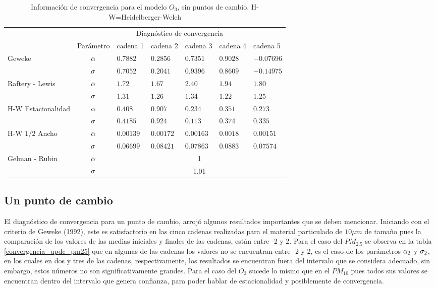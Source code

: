 \begin{table}[!h]
\centering
\begin{tabular}{|l|c|l|l|l|l|l|}
\hline
& \multicolumn{6}{|c|}{Diagnóstico de convergencia} \\
\cline{2-7}
& Parámetro & cadena 1  & cadena 2  & cadena 3 & cadena 4 & cadena 5	 \\
\hline \hline
\multirow{2}{2.5cm}{Geweke} & $\alpha$ & $0.7882$ & $0.2856 $ & $0.7351$ & $0.9028$  & $ -0.07696$\\ \cline{2-7}
& $\sigma$& $0.7052 $ & $0.2041$ & $0.9396$ & $0.8609$ & $-0.14975$\\
  \cline{1-7}
\multirow{2}{2.5cm}{Raftery - Lewis} & $\alpha$ & $ 1.72  $& $  1.67$ & $ 2.40$ & $1.94 $ & $ 1.80 $\\ \cline{2-7}
& $\sigma$ & \multicolumn{1}{l|}{$1.31$} & $1.26$ & $ 1.34 $ & $1.22 $ & $1.25$ \\ \cline{1-7}
\multirow{2}{2.5cm}{H-W Estacionalidad} & $\alpha$ & $0.408$ & $0.907 $ & $0.234$ & $ 0.351$ & $0.273$ \\ \cline{2-7}
&$\sigma$ & \multicolumn{1}{l|}{$0.4185$} & $ 0.924$ &  $ 0.113  $ & $0.374$ & $ 0.335  $ \\ \cline{1-7}
\multirow{2}{2.5cm}{H-W $1/2$ Ancho} & $\alpha$ & $0.00139$ & $0.00172$ & $0.00163$ & $0.0018 $  & $0.00151$  \\ \cline{2-7}
&$\sigma$ & \multicolumn{1}{l|}{$0.06699 $} & $0.08421$ & $0.07863$ & $ 0.0883$ & $0.07574 $ \\ \cline{1-7}

\multirow{2}{2.5cm}{Gelman - Rubin} & $\alpha$ & \multicolumn{5}{|c|}{1}\\ \cline{2-7}
&$\sigma$ &  \multicolumn{5}{|c|}{1.01} \\ \cline{1-7}



\end{tabular}
\caption{Información de convergencia para el modelo $O_3$, sin puntos de cambio. H-W=Heidelberger-Welch}
\label{converozono}
\end{table}

\subsection{Un punto de cambio}

El diagnóstico de convergencia para un punto de cambio, arrojó algunos resultados importantes que se deben mencionar. Iniciando con el criterio de Geweke (1992), este es satisfactorio en las cinco cadenas realizadas para el material particulado de $10\mu m$ de tamaño pues la comparación de los valores de las medias iniciales y finales de las cadenas, están entre -2 y 2. Para el caso del $PM_{2.5}$ se observa en la tabla \ref{convergencia_updc_pm25} que en algunas de las cadenas los valores no se encuentran entre -2 y 2, es el caso de los parámetros $\alpha_2$ y $\sigma_2$, en los cuales en dos y tres de las cadenas, respectivamente, los resultados se encuentran fuera del intervalo que se considera adecuado, sin embargo, estos números no son significativamente grandes. Para el caso del $O_3$ sucede lo mismo que en el $PM_{10}$ pues todos sus valores se encuentran dentro del intervalo que genera confianza, para poder hablar de estacionalidad y posiblemente de convergencia. 

